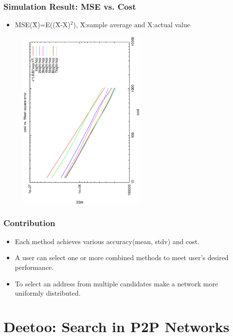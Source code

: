 \documentclass[red]{beamer}
\begin{document}
\begin{frame}
\frametitle{Simulation Result: MSE vs. Cost}
\begin{itemize}
\item MSE(\=X)=E((\=X-X)$^{2}$), \=X:sample average and X:actual value  
\end{itemize}
\begin{figure}
\centering
\includegraphics[width=2.5in,angle=270]{figs/cost_mse1}
\end{figure}
\end{frame}
\begin{frame}
\frametitle{Contribution}
\begin{itemize}
\item Each method achieves various accuracy(mean, stdv) and cost.
\item A user can select one or more combined methods to meet user's desired performance.
\item To select an address from multiple candidates make a network more uniformly distributed.
\end{itemize}
\end{frame}


\section{Deetoo: Search in P2P Networks}
\end{document}
